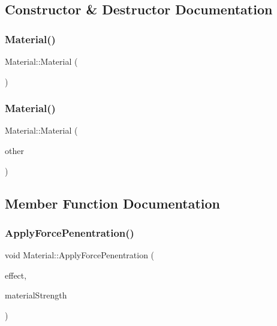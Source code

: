 \subsection{Constructor \& Destructor Documentation}
\mbox{\label{class_material_a137e987401b63eb7c6c27c3e38bc74b5}} 
\subsubsection{\texorpdfstring{Material()}{Material()}\hspace{0.1cm}{\footnotesize\ttfamily [1/2]}}
{\footnotesize\ttfamily Material\+::\+Material (\begin{DoxyParamCaption}{ }\end{DoxyParamCaption})}

\mbox{\label{class_material_ac9b027e9c501776e7d08589a52e9d795}} 
\subsubsection{\texorpdfstring{Material()}{Material()}\hspace{0.1cm}{\footnotesize\ttfamily [2/2]}}
{\footnotesize\ttfamily Material\+::\+Material (\begin{DoxyParamCaption}\item[{const \mbox{\hyperlink{class_material}{Material}} \&}]{other }\end{DoxyParamCaption})}



\subsection{Member Function Documentation}
\mbox{\label{class_material_af12a8f6e8bba1bffc37036530660cead}} 
\subsubsection{\texorpdfstring{Apply\+Force\+Penentration()}{ApplyForcePenentration()}}
{\footnotesize\ttfamily void Material\+::\+Apply\+Force\+Penentration (\begin{DoxyParamCaption}\item[{\mbox{\hyperlink{struct_applied_force_effect}{Applied\+Force\+Effect}} \&}]{effect,  }\item[{float}]{material\+Strength }\end{DoxyParamCaption})\hspace{0.3cm}{\ttfamily [private]}}

